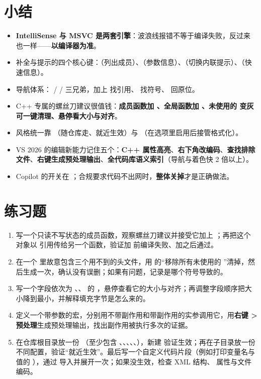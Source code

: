 \section{小结}

\begin{itemize}
  \item \textbf{IntelliSense 与 MSVC 是两套引擎}：波浪线报错不等于编译失败，反过来也一样——\textbf{以编译器为准}。
  \item 补全与提示的四个核心键：（列出成员）、（参数信息）、（切换内联提示）、（快速信息）。
  \item 导航体系： /  /  三兄弟，加上  找引用、 找符号、 回原位。
  \item C++ 专属的螺丝刀建议很值钱：\textbf{成员函数加 、全局函数加 、未使用的  变灰可一键清理、悬停看大小与对齐}。
  \item 风格统一靠 \textbf{}（随仓库走、就近生效）与 \textbf{}（在选项里启用后接管格式化）。
  \item VS 2026 的编辑新能力记住五个：\textbf{C++ 属性高亮}、\textbf{右下角改编码}、\textbf{查找排除文件}、\textbf{右键生成预处理输出}、\textbf{全代码库语义索引}（导航与着色快 2 倍以上）。
  \item Copilot 的开关在 ；合规要求代码不出网时，\textbf{整体关掉}才是正确做法。
\end{itemize}

\section{练习题}

\begin{enumerate}
  \item 写一个只读不写状态的成员函数，观察螺丝刀建议并接受它加上 ；再把这个对象以  引用传给另一个函数，验证加  前编译失败、加之后通过。
  \item 在一个  里故意包含三个用不到的头文件，用  的“移除所有未使用的 ”清掉，然后生成一次，确认没有误删；如果有问题，记录是哪个符号导致的。
  \item 写一个字段依次为 、、 的 ，悬停查看它的大小与对齐；再调整字段顺序把大小降到最小，并解释填充字节是怎么来的。
  \item 定义一个带参数的宏，分别用不带副作用和带副作用的实参调用它，用\textbf{右键 > 预处理}生成预处理输出，找出副作用被执行多次的证据。
  \item 在仓库根目录放一份 （至少包含 、、、、、），新建  验证生效；再在子目录放一份不同配置，验证“就近生效”。最后写一个自定义代码片段（例如打印变量名与值的 ），通过  导入并展开一次；如果没生效，检查 XML 结构、 属性与文件编码。
\end{enumerate}

